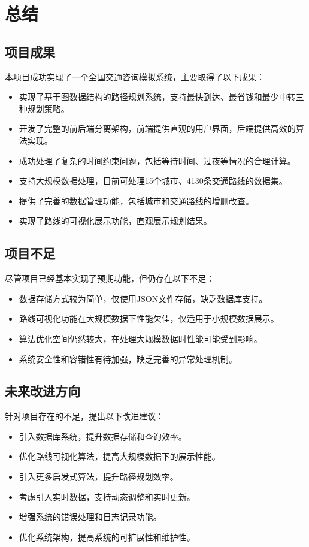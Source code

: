 \documentclass[10pt]{article}
\begin{document}
    \section{总结}

    \subsection{项目成果}
    本项目成功实现了一个全国交通咨询模拟系统，主要取得了以下成果：

    \begin{itemize}
        \item 实现了基于图数据结构的路径规划系统，支持最快到达、最省钱和最少中转三种规划策略。
        \item 开发了完整的前后端分离架构，前端提供直观的用户界面，后端提供高效的算法实现。
        \item 成功处理了复杂的时间约束问题，包括等待时间、过夜等情况的合理计算。
        \item 支持大规模数据处理，目前可处理15个城市、4130条交通路线的数据集。
        \item 提供了完善的数据管理功能，包括城市和交通路线的增删改查。
        \item 实现了路线的可视化展示功能，直观展示规划结果。
    \end{itemize}
    
    \subsection{项目不足}
    尽管项目已经基本实现了预期功能，但仍存在以下不足：

    \begin{itemize}
        \item 数据存储方式较为简单，仅使用JSON文件存储，缺乏数据库支持。
        \item 路线可视化功能在大规模数据下性能欠佳，仅适用于小规模数据展示。
        \item 算法优化空间仍然较大，在处理大规模数据时性能可能受到影响。
        \item 系统安全性和容错性有待加强，缺乏完善的异常处理机制。
    \end{itemize}
    
    \subsection{未来改进方向}
    针对项目存在的不足，提出以下改进建议：

    \begin{itemize}
        \item 引入数据库系统，提升数据存储和查询效率。
        \item 优化路线可视化算法，提高大规模数据下的展示性能。
        \item 引入更多启发式算法，提升路径规划效率。
        \item 考虑引入实时数据，支持动态调整和实时更新。
        \item 增强系统的错误处理和日志记录功能。
        \item 优化系统架构，提高系统的可扩展性和维护性。
    \end{itemize}
\end{document}
